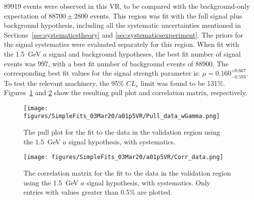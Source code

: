 \documentclass[NOTE, atlasdraft=true, texlive=2017, UKenglish]{\ATLASLATEXPATH atlasdoc}
\begin{document}
89919 events were observed in this VR, to be compared with the background-only expectation of $88700 \pm 2800$ events. This region was fit with the full signal plus background hypothesis, including all the systematic uncertainties mentioned in Sections~\ref{sec:systematicstheory} and \ref{sec:systematicsexperiment}. The priors for the signal systematics were evaluated separately for this region. When fit with the 1.5~GeV $a$ signal and background hypotheses, the best fit number of signal events was 997, with a best fit number of background events of 88900. The corresponding best fit values for the signal strength parameter is: $\mu=0.160^{+0.667}_{-0.593}$. To test the relevant machinery, the 95\% $CL_s$ limit was found to be 131\%. Figures~\ref{fig:vrpulls} and \ref{fig:vrcorr} show the resulting pull plot and correlation matrix, respectively. %


\begin{figure}[!htbp]
  \centering
  \texttt{[image: figures/SimpleFits\_03Mar20/a01p5VR/Pull\_data\_wGamma.png]}
  \caption{The pull plot for the fit to the data in the validation region using the 1.5~GeV $a$ signal hypothesis, with systematics.}
  \label{fig:vrpulls}
\end{figure}

\begin{figure}[!htbp]
  \centering
  \texttt{[image: figures/SimpleFits\_03Mar20/a01p5VR/Corr\_data.png]}
  \caption{The correlation matrix for the fit to the data in the validation region using the 1.5~GeV $a$ signal hypothesis, with systematics. Only entries with values greater than 0.5\% are plotted.}
  \label{fig:vrcorr}
\end{figure}

\end{document}
